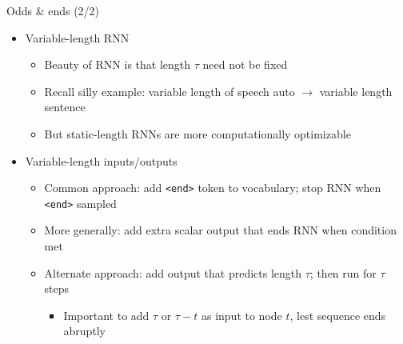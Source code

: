 \begin{frame}{Odds \& ends (2/2)}
    \begin{itemize}
        \item<+-> Variable-length RNN
        \begin{itemize}
            \item Beauty of RNN is that length $\tau$ need not be fixed
            \item Recall silly example: variable length of speech auto $\to$ variable length sentence
            \item But static-length RNNs are more computationally optimizable
        \end{itemize}
        \item<+-> Variable-length inputs/outputs
        \begin{itemize}
            \item Common approach: add \texttt{<end>} token to vocabulary; stop RNN when \texttt{<end>} sampled
            \item More generally: add extra scalar output that ends RNN when condition met
            \item Alternate approach: add output that predicts length $\tau$; then run for $\tau$ steps
            \begin{itemize}
                \item Important to add $\tau$ or $\tau - t$ as input to node $t$, lest sequence ends abruptly
            \end{itemize}
        \end{itemize}
    \end{itemize}
\end{frame}

